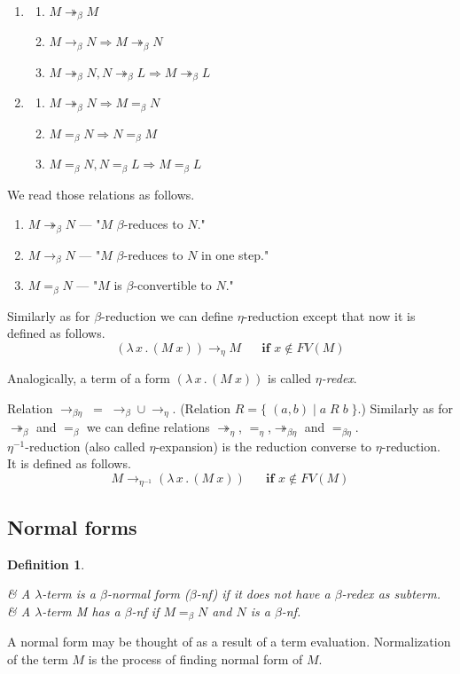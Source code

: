 \documentclass{sig-alternate}
\newtheorem{definition}{Definition}
\newcommand{\lterm}{$\lambda$-term\xspace}
\newcommand{\then}{\Rightarrow\xspace}
\newcommand{\lamb}[2]{( \lambda \, #1 \, . \, #2 )}
\newcommand{\bbarr}{\twoheadrightarrow_\beta}
\newcommand{\barr}{\rightarrow_\beta}
\newcommand{\beq}{=_\beta}
\newcommand{\eearr}{\twoheadrightarrow_\eta}
\newcommand{\earr}{\rightarrow_\eta}
\newcommand{\eeq}{=_\eta}
\newcommand{\bearr}{\rightarrow_{\beta\eta}}
\newcommand{\bbeearr}{\twoheadrightarrow_{\beta\eta}}
\newcommand{\beeq}{=_{\beta\eta}}
\newcommand{\bnf}{$\beta$-\textit{nf}\xspace}
\newcommand{\eArrow}{\rightarrow_\eta\xspace}
\newcommand{\eeArrow}{\rightarrow_{\eta^{-1}}\xspace}
\begin{document}
\begin{enumerate}
 \item \begin{enumerate}
 	\item $M \bbarr M$
 	\item $M \barr N \then M \bbarr N$
 	\item $M \bbarr N , N \bbarr L \then M \bbarr L$ 	
 \end{enumerate}
 \item \begin{enumerate}
 	\item $M \bbarr N \then M \beq N$
 	\item $M \beq N \then N \beq M$
 	\item $M \beq N , N \beq L \then M \beq L$
 \end{enumerate}

\end{enumerate}

We read those relations as follows.
\begin{enumerate}
 	\item $M \bbarr N$ --- "$M$ $\beta$-reduces to $N$."  
 	\item $M \barr N$  --- "$M$ $\beta$-reduces to $N$
 	      in one step."
 	\item $M \beq N$ --- "$M$ is $\beta$-convertible to $N$."	
 \end{enumerate}


Similarly as for $\beta$-reduction we can define $\eta$-reduction except that now it is defined as follows.  
$$\lamb{x}{(M~x)} \eArrow M \textbf{ ~~~~if } x \not\in FV(M) $$

Analogically, a term of a form $\lamb{x}{(M~x)}$ is called 
\textit{$\eta$-redex}.

Relation $\bearr\;=\;\barr \cup \earr$. 
(Relation $R = \{\;(a,b)\;|\;a\;R\;b\;\}$.)
Similarly as for $\bbarr$ and $\beq$ we can define relations 
$\eearr$, $\eeq$,$\bbeearr$ and $\beeq$.\\

$\eta^{-1}$-reduction (also called $\eta$-expansion) is 
the reduction converse to $\eta$-reduction.
It is defined as follows.  
$$M \eeArrow \lamb{x}{(M~x)} \textbf{ ~~~~if } x \not\in FV(M) $$


\subsection{Normal forms}
\begin{definition}~

\begin{easylist}[enumerate]
& A \lterm is a \textit{$\beta$-normal form} (\bnf) 
if it does not have a $\beta$-redex as subterm.
& A \lterm M \textit{has} a \bnf if $M \beq N$
and $N$ is a \bnf.\\
\end{easylist}
\end{definition}
A normal form may be thought of as a result of a term evaluation. 
Normalization of the term $M$ is the process of finding normal form of $M$. 
\end{document}
